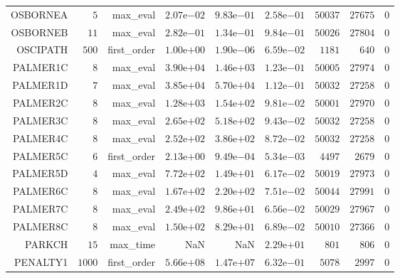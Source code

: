 \begin{longtable}{rrrrrrrrr}
OSBORNEA & \(     5\) & max\_eval & \( 2.07\)e\(-02\) & \( 9.83\)e\(-01\) & \( 2.58\)e\(-01\) & \( 50037\) & \( 27675\) & \(     0\) \\
OSBORNEB & \(    11\) & max\_eval & \( 2.82\)e\(-01\) & \( 1.34\)e\(-01\) & \( 9.84\)e\(-01\) & \( 50026\) & \( 27804\) & \(     0\) \\
OSCIPATH & \(   500\) & first\_order & \( 1.00\)e\(+00\) & \( 1.90\)e\(-06\) & \( 6.59\)e\(-02\) & \(  1181\) & \(   640\) & \(     0\) \\
PALMER1C & \(     8\) & max\_eval & \( 3.90\)e\(+04\) & \( 1.46\)e\(+03\) & \( 1.23\)e\(-01\) & \( 50005\) & \( 27974\) & \(     0\) \\
PALMER1D & \(     7\) & max\_eval & \( 3.85\)e\(+04\) & \( 5.70\)e\(+04\) & \( 1.12\)e\(-01\) & \( 50032\) & \( 27258\) & \(     0\) \\
PALMER2C & \(     8\) & max\_eval & \( 1.28\)e\(+03\) & \( 1.54\)e\(+02\) & \( 9.81\)e\(-02\) & \( 50001\) & \( 27970\) & \(     0\) \\
PALMER3C & \(     8\) & max\_eval & \( 2.65\)e\(+02\) & \( 5.18\)e\(+02\) & \( 9.43\)e\(-02\) & \( 50032\) & \( 27258\) & \(     0\) \\
PALMER4C & \(     8\) & max\_eval & \( 2.52\)e\(+02\) & \( 3.86\)e\(+02\) & \( 8.72\)e\(-02\) & \( 50032\) & \( 27258\) & \(     0\) \\
PALMER5C & \(     6\) & first\_order & \( 2.13\)e\(+00\) & \( 9.49\)e\(-04\) & \( 5.34\)e\(-03\) & \(  4497\) & \(  2679\) & \(     0\) \\
PALMER5D & \(     4\) & max\_eval & \( 7.72\)e\(+02\) & \( 1.49\)e\(+01\) & \( 6.17\)e\(-02\) & \( 50019\) & \( 27973\) & \(     0\) \\
PALMER6C & \(     8\) & max\_eval & \( 1.67\)e\(+02\) & \( 2.20\)e\(+02\) & \( 7.51\)e\(-02\) & \( 50044\) & \( 27991\) & \(     0\) \\
PALMER7C & \(     8\) & max\_eval & \( 2.49\)e\(+02\) & \( 9.86\)e\(+01\) & \( 6.56\)e\(-02\) & \( 50029\) & \( 27967\) & \(     0\) \\
PALMER8C & \(     8\) & max\_eval & \( 1.50\)e\(+02\) & \( 8.29\)e\(+01\) & \( 6.89\)e\(-02\) & \( 50010\) & \( 27366\) & \(     0\) \\
PARKCH & \(    15\) & max\_time &       NaN &       NaN & \( 2.29\)e\(+01\) & \(   801\) & \(   806\) & \(     0\) \\
PENALTY1 & \(  1000\) & first\_order & \( 5.66\)e\(+08\) & \( 1.47\)e\(+07\) & \( 6.32\)e\(-01\) & \(  5078\) & \(  2997\) & \(     0\) \\

\end{longtable}
